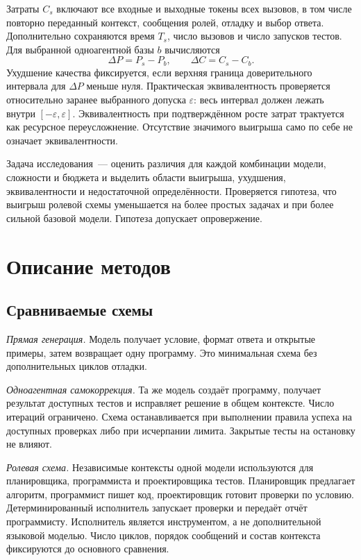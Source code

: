 \documentclass{misisarticle}
\begin{document}
Затраты $C_s$ включают все входные и выходные токены всех вызовов, в том числе повторно переданный контекст, сообщения ролей, отладку и выбор ответа. Дополнительно сохраняются время $T_s$, число вызовов и число запусков тестов. Для выбранной одноагентной базы $b$ вычисляются
\begin{equation}
 \Delta P=P_s-P_b,\qquad \Delta C=C_s-C_b.
\end{equation}
Ухудшение качества фиксируется, если верхняя граница доверительного интервала для $\Delta P$ меньше нуля. Практическая эквивалентность проверяется относительно заранее выбранного допуска $\varepsilon$: весь интервал должен лежать внутри $[-\varepsilon,\varepsilon]$. Эквивалентность при подтверждённом росте затрат трактуется как ресурсное переусложнение. Отсутствие значимого выигрыша само по себе не означает эквивалентности.

Задача исследования~--- оценить различия для каждой комбинации модели, сложности и бюджета и выделить области выигрыша, ухудшения, эквивалентности и недостаточной определённости. Проверяется гипотеза, что выигрыш ролевой схемы уменьшается на более простых задачах и при более сильной базовой модели. Гипотеза допускает опровержение.

\section{Описание методов}
\subsection{Сравниваемые схемы}
\textit{Прямая генерация.} Модель получает условие, формат ответа и открытые примеры, затем возвращает одну программу. Это минимальная схема без дополнительных циклов отладки.

\textit{Одноагентная самокоррекция.} Та же модель создаёт программу, получает результат доступных тестов и исправляет решение в общем контексте. Число итераций ограничено. Схема останавливается при выполнении правила успеха на доступных проверках либо при исчерпании лимита. Закрытые тесты на остановку не влияют.

\textit{Ролевая схема.} Независимые контексты одной модели используются для планировщика, программиста и проектировщика тестов. Планировщик предлагает алгоритм, программист пишет код, проектировщик готовит проверки по условию. Детерминированный исполнитель запускает проверки и передаёт отчёт программисту. Исполнитель является инструментом, а не дополнительной языковой моделью. Число циклов, порядок сообщений и состав контекста фиксируются до основного сравнения.
\end{document}
